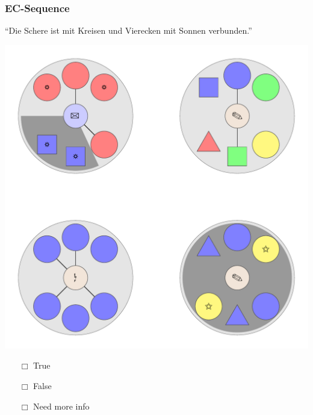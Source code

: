 \documentclass[fleqn,10pt,serif,xcolor=dvipsnames]{beamer}
\newcommand{\EC}{EC}
\newcommand{\mymark}[1]{{\color{blue}{#1}}}
\begin{document}
\begin{frame}
  \frametitle{\EC-Sequence}
  \begin{center}
    ``Die Schere ist mit Kreisen und Vierecken mit Sonnen verbunden.''

    \vspace{0.1cm}

    \includegraphics[width=0.5 \textwidth]{../../pictures/ec_01_4.pdf}

    \vspace{0.1cm}

    \begin{multicols}{3}
      \begin{itemize} 
      \item[$\Box$] True\\
        \onslide<2>{$\leadsto$  \mymark{false}}
      \item[$\Box$] False\\
        \onslide<2>{$\leadsto$ \mymark{false}}
      \item[$\Box$] Need more info 
      \end{itemize}
    \end{multicols}

  \end{center}
\end{frame}
\end{document}
